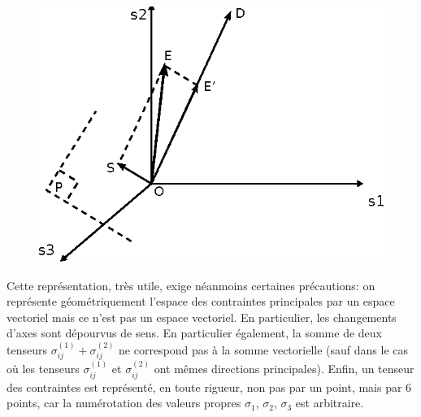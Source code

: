 \begin{figure}
    \begin{center}
        \includegraphics{../images/T1_Ch02-0012}
    \end{center}
\end{figure}
Cette représentation, très utile, exige néanmoins certaines précautions: on représente géométriquement l'espace des contraintes principales par un espace vectoriel mais ce n'est pas un espace vectoriel.
En particulier, les changements d'axes sont dépourvus de sens.
En particulier également, la somme de deux tenseurs $\sigma_{ij}^{(1)} + \sigma_{ij}^{(2)}$ ne correspond pas à la somme vectorielle (sauf dans le cas où les tenseurs $\sigma_{ij}^{(1)}$ et $\sigma_{ij}^{(2)}$ ont mêmes directions principales).
Enfin, un tenseur des contraintes est représenté, en toute rigueur, non pas par un point, mais par 6 points, car la numérotation des valeurs propres $\sigma_1$, $\sigma_2$, $\sigma_3$ est arbitraire. 

